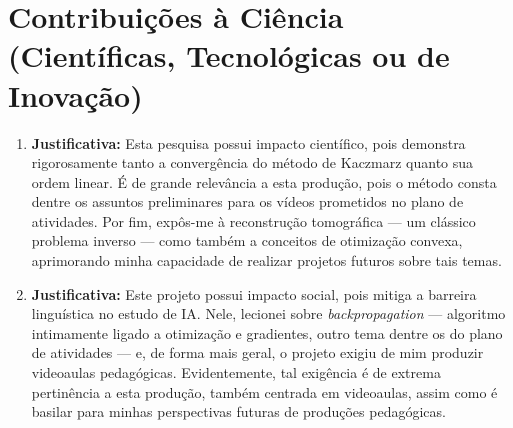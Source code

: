 \section{Contribuições à Ciência (Científicas, Tecnológicas ou de Inovação)}
\begin{enumerate}[label=$\bullet$, itemsep=1.25\baselineskip, topsep=0.5\baselineskip]
	\item

	\medskip
	\textbf{Justificativa:}
	Esta pesquisa possui impacto científico, pois demonstra rigorosamente tanto a convergência do método de Kaczmarz quanto sua ordem linear.
	É de grande relevância a esta produção, pois o método consta dentre os assuntos preliminares para os vídeos prometidos no plano de atividades.
	Por fim, expôs-me à reconstrução tomográfica --- um clássico problema inverso --- como também a conceitos de otimização convexa, aprimorando minha capacidade de realizar projetos futuros sobre tais temas.


	\item

	\medskip
	\textbf{Justificativa:}
	Este projeto possui impacto social, pois mitiga a barreira linguística no estudo de IA.
	Nele, lecionei sobre \emph{backpropagation} --- algoritmo intimamente ligado a otimização e gradientes, outro tema dentre os do plano de atividades --- e, de forma mais geral, o projeto exigiu de mim produzir videoaulas pedagógicas. Evidentemente, tal exigência é de extrema pertinência a esta produção, também centrada em videoaulas,
	assim como é basilar para minhas perspectivas futuras de produções pedagógicas.
\end{enumerate}

